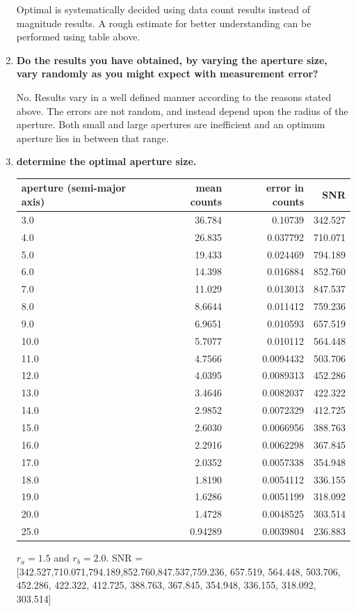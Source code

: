 \documentclass{article}
\begin{document}
\begin{enumerate}
		Optimal is systematically decided using data count results instead of magnitude results. A rough estimate for better understanding can be performed using table above.
		
		\item \textbf{Do the results you have obtained, by varying the aperture size, vary randomly as you might expect with measurement error?}
		
		No. Results vary in a well defined manner according to the reasons stated above. The errors are not random, and instead depend upon the radius of the aperture. Both small and large apertures are inefficient and an optimum aperture lies in between that range.
		
		\item \textbf{determine the optimal aperture size.}
		
		\begin{table} [h]
			\centering
			\begin{tabular} {l r r r}
				\toprule
				\textbf{aperture (semi-major axis)} & \textbf{mean counts} & \textbf{error in counts} & \textbf{SNR}\\
				\midrule
				3.0 & 36.784 & 0.10739 & 342.527 \\
				4.0 & 26.835 & 0.037792 & 710.071 \\
				5.0 & 19.433 & 0.024469 & 794.189 \\
				6.0 & 14.398 & 0.016884 & 852.760 \\
				7.0 & 11.029 & 0.013013 & 847.537 \\
				8.0 & 8.6644 & 0.011412 & 759.236 \\
				9.0 & 6.9651 & 0.010593 & 657.519 \\
				10.0 & 5.7077 & 0.010112 & 564.448 \\
				11.0 & 4.7566 & 0.0094432 & 503.706 \\
				12.0 & 4.0395 & 0.0089313 & 452.286 \\
				13.0 & 3.4646 & 0.0082037 & 422.322 \\
				14.0 & 2.9852 & 0.0072329 & 412.725 \\
				15.0 & 2.6030 & 0.0066956 & 388.763 \\
				16.0 & 2.2916 & 0.0062298 & 367.845 \\
				17.0 & 2.0352 & 0.0057338 & 354.948 \\
				18.0 & 1.8190 & 0.0054112 & 336.155 \\
				19.0 & 1.6286 & 0.0051199 & 318.092 \\
				20.0 & 1.4728 & 0.0048525 & 303.514 \\
				25.0 & 0.94289 & 0.0039804 & 236.883 \\
				\bottomrule
			\end{tabular}
		\end{table}
		\(r_a=1.5\) and \(r_b=2.0\). SNR = [342.527,710.071,794.189,852.760,847.537,759.236, 657.519, 564.448, 503.706, 452.286, 422.322, 412.725, 388.763, 367.845, 354.948, 336.155, 318.092, 303.514]
		

\end{enumerate}
\end{document}
